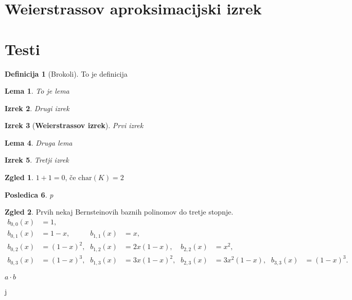 \documentclass[a4paper]{amsart}
\theoremstyle{theorem}
\newtheorem{izrek}{Izrek}[section]
\newtheorem{lema}[izrek]{Lema}
\newtheorem{posledica}[izrek]{Posledica}
\theoremstyle{definition}
\newtheorem{definicija}{Definicija}[section]
\newtheorem*{zgled*}{Zgled}
\begin{document}
\newpage
\section{Weierstrassov aproksimacijski izrek}











\newpage
\section{Testi}

\begin{definicija}[Brokoli]
	To je definicija
\end{definicija}

\begin{lema}
	To je lema
\end{lema}

\begin{izrek}
	Drugi izrek
\end{izrek}

\begin{izrek}[\textbf{Weierstrassov izrek}]
	Prvi izrek
\end{izrek}

\begin{lema}
	Druga lema
\end{lema}

\begin{izrek}
	Tretji izrek
\end{izrek}

\begin{zgled*}
	$1 + 1 = 0$, če $\text{char}(K) = 2$
\end{zgled*}

\begin{posledica}
	p
\end{posledica}

\begin{zgled*}
	Prvih nekaj Bernsteinovih baznih polinomov do tretje stopnje.
		\begin{align*}
			b_{0,0}(x) &= 1\text{,}          &             &               
			&             &               &             &  \\
			b_{0,1}(x) &= 1 - x\text{,}      &  b_{1,1}(x) &= x\text{,}            
			&             &               &             &  \\
			b_{0,2}(x) &= (1 - x)^2\text{,}  &  b_{1,2}(x) &= 2x(1 - x)\text{,}    
			&  b_{2,2}(x) &= x^2\text{,}          &             &  \\ 
			b_{0,3}(x) &= (1 - x)^3\text{,}  &  b_{1,3}(x) &= 3x(1 - x)^2\text{,}  
			&  b_{2,3}(x) &= 3x^2(1 - x)\text{,}  &  b_{3,3}(x) &= (1 - x)^3\text{.}
		\end{align*}
	\end{zgled*}

$ a \cdot b$

\newpage
j
\end{document}
